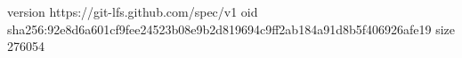 version https://git-lfs.github.com/spec/v1
oid sha256:92e8d6a601cf9fee24523b08e9b2d819694c9ff2ab184a91d8b5f406926afe19
size 276054
